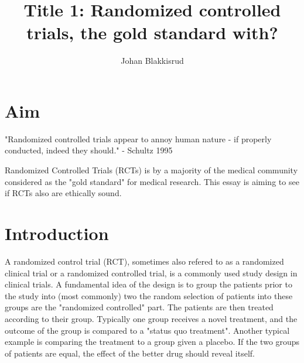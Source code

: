 \documentclass[12p]{article}
\title{Title 1: Randomized controlled trials, the gold standard with?
}
\author{Johan Blakkisrud}
\begin{document}
\maketitle

\section*{Aim}

"Randomized controlled trials appear to annoy human nature - if properly conducted, indeed they should." - Schultz 1995

Randomized Controlled Trials (RCTs) is by a majority of the medical community considered as the "gold standard" for medical research.
This essay is aiming to see if RCTs also are ethically sound.

\section*{Introduction}

A randomized control trial (RCT), sometimes also refered to as a randomized clinical trial or a randomized controlled trial, is a commonly used study design in clinical trials.
A fundamental idea of the design is to group the patients prior to the study into (most commonly) two the random selection of patients into these groups are the "randomized controlled" part.
The patients are then treated according to their group.
Typically one group receives a novel treatment, and the outcome of the group is compared to a "status quo treatment".
Another typical example is comparing the treatment to a group given a placebo. 
If the two groups of patients are equal, the effect of the better drug should reveal itself.
\end{document}
